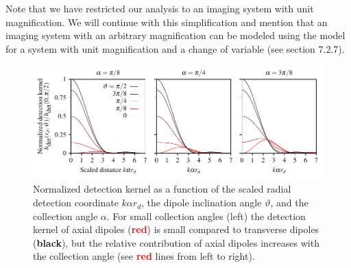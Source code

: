 \documentclass[]{osa-article}
\begin{document}
Note that we have restricted our analysis to an imaging system with unit
magnification. We will continue with this simplification and mention that an
imaging system with an arbitrary magnification can be modeled using the model
for a system with unit magnification and a change of variable (see
\cite{barrett2004} section 7.2.7).

\begin{figure}[h]
 \centering
   \centering
   \includegraphics[scale=0.8]{../figures/detection/detection.pdf}
   \caption{Normalized detection kernel as a function of the scaled radial
     detection coordinate $k\alpha r_d$, the dipole inclination angle
     $\vartheta$, and the collection angle $\alpha$. For small
     collection angles (left) the detection kernel of axial dipoles
     (\textcolor{red}{\textbf{red}}) is small compared to transverse dipoles
     (\textbf{black}), but the relative contribution of axial dipoles increases
     with the collection angle (see \textcolor{red}{\textbf{red}} lines from
     left to right).}
   \label{fig:hdet}
 \end{figure}
 
\end{document}
